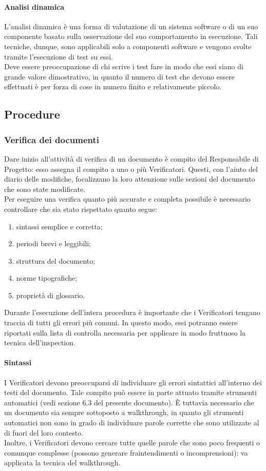 			\paragraph{Analisi dinamica}
				L'analisi dinamica è una forma di valutazione di un sistema software o di un suo componente basato sulla osservazione del suo 
				comportamento in esecuzione. Tali tecniche, dunque, sono applicabili solo a componenti software e vengono svolte tramite l'esecuzione 
				di test su essi.\\
				Deve essere preoccupazione di chi scrive i test fare in modo che essi siano di grande valore dimostrativo, in quanto il numero di test 
				che devono essere effettuati è per forza di cose in numero finito e relativamente piccolo.
	\subsection{Procedure}
		\subsubsection{Verifica dei documenti}
			Dare inizio all'attività di verifica di un documento è compito del Responsabile di Progetto: esso assegna il compito a uno o più Verificatori. 
			Questi, con l'aiuto del diario delle modifiche, focalizzano la loro attenzione sulle sezioni del documento che sono state modificate.\\
			Per eseguire una verifica quanto più accurate e completa possibile è necessario controllare che sia stato rispettato quanto segue:
			\begin{enumerate}
				\item sintassi semplice e corretta;
				\item periodi brevi e leggibili;
				\item struttura del documento;
				\item norme tipografiche;
				\item proprietà di glossario.
			\end{enumerate}
			Durante l'esecuzione dell'intera procedura è importante che i Verificatori tengano traccia di tutti gli errori più comuni. In questo modo, 
			essi potranno essere riportati sulla lista di controlla necessaria per applicare in modo fruttuoso la tecnica dell'inspection.
			\paragraph{Sintassi}
				I Verificatori devono preoccuparsi di individuare gli errori sintattici all'interno dei testi del documento. Tale compito può essere in 
				parte attuato tramite strumenti automatici (vedi sezione 6.3 del presente documento). È tuttavia necessario che un documento sia sempre sottoposto a walkthrough, in quanto gli 
				strumenti automatici non sono in grado di individuare parole corrette che sono utilizzate al di fuori del loro contesto.\\
				Inoltre, i Verificatori devono cercare tutte quelle parole che sono poco frequenti o comunque complesse (possono generare fraintendimenti 
				o incomprensioni): va applicata la tecnica del walkthrough.
